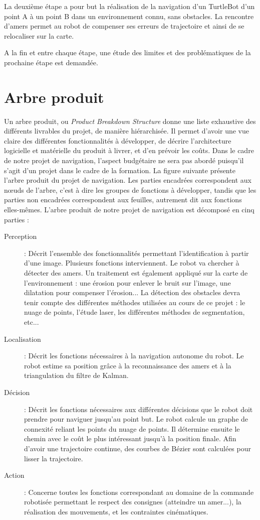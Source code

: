 \documentclass[10pt,a4paper]{article}
\begin{document}
La deuxième étape a pour but la réalisation de la navigation d'un TurtleBot d'un point A à un point B dans un environnement connu, sans obstacles. La rencontre d'amers permet au robot de compenser ses erreurs de trajectoire et ainsi de se relocaliser sur la carte.

A la fin et entre chaque étape, une étude des limites et des problématiques de la prochaine étape est demandée.


\newpage
\section{Arbre produit}

Un arbre produit, ou \textit{Product Breakdown Structure} donne une liste exhaustive des différents livrables du projet, de manière hiérarchisée. Il permet d’avoir une vue claire des différentes fonctionnalités à développer, de décrire l’architecture logicielle et matérielle du produit à livrer, et d’en prévoir les coûts. Dans le cadre de notre projet de navigation, l’aspect budgétaire ne sera pas abordé puisqu’il s’agit d’un projet dans le cadre de la formation.
La figure suivante présente l’arbre produit du projet de navigation. Les parties encadrées correspondent aux nœuds de l'arbre, c’est à dire les groupes de fonctions à développer, tandis que les parties non encadrées correspondent aux feuilles, autrement dit aux fonctions elles-mêmes.
L’arbre produit de notre projet de navigation est décomposé en cinq parties :

\begin{description}
\item  [Perception] : Décrit l’ensemble des fonctionnalités permettant l’identification à partir d’une image. Plusieurs fonctions interviennent. Le robot va chercher à détecter des amers. Un traitement est également appliqué sur la carte de l'environnement : une érosion pour enlever le bruit sur l'image, une dilatation pour compenser l'érosion...
La détection des obstacles devra tenir compte des différentes méthodes utilisées au cours de ce projet : le nuage de points, l’étude laser, les différentes méthodes de segmentation, etc...
\item [Localisation] : Décrit les fonctions nécessaires à la navigation autonome du robot. Le robot estime sa position grâce à la reconnaissance des amers et à la triangulation du filtre de Kalman.
\item [Décision] : Décrit les fonctions nécessaires aux différentes décisions que le robot doit prendre pour naviguer jusqu'au point but. Le robot calcule un graphe de connexité reliant les points du nuage de points. Il détermine ensuite le chemin avec le coût le plus intéressant jusqu'à la position finale. Afin d'avoir une trajectoire continue, des courbes de Bézier sont calculées pour lisser la trajectoire.
\item [Action] : Concerne toutes les fonctions correspondant au domaine de la commande robotisée permettant le respect des consignes (atteindre un amer...), la réalisation des mouvements, et les contraintes cinématiques.
\end{description}
\end{document}
